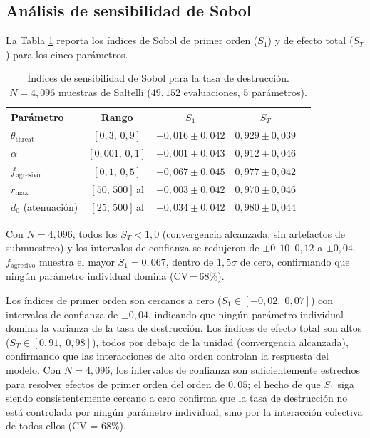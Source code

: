 \documentclass[11pt,a4paper,onecolumn]{article}
\begin{document}
\subsection{Análisis de sensibilidad de Sobol}
\label{sec:sobol_results}

La Tabla \ref{tab:sobol} reporta los índices de Sobol de primer orden
($S_1$) y de efecto total ($S_T$) para los cinco parámetros.

\begin{table}
  \centering
  \caption{Índices de sensibilidad de Sobol para la tasa de destrucción.
           $N = 4{,}096$ muestras de Saltelli ($49{,}152$ evaluaciones,
           5 parámetros).}
  \label{tab:sobol}
  \begin{tabular}{lcccc}
    \toprule
    Parámetro & Rango & $S_1$ & $S_T$ \\
    \midrule
    $\theta_\text{threat}$ & $[0{,}3,\,0{,}9]$     & $-0{,}016\pm0{,}042$ & $0{,}929\pm0{,}039$ \\
    $\alpha$               & $[0{,}001,\,0{,}1]$   & $-0{,}001\pm0{,}043$ & $0{,}912\pm0{,}046$ \\
    $f_\text{agresivo}$    & $[0{,}1,\,0{,}5]$     & $+0{,}067\pm0{,}045$ & $0{,}977\pm0{,}042$ \\
    $r_\text{max}$         & $[50,\,500]$\,al       & $+0{,}003\pm0{,}042$ & $0{,}970\pm0{,}046$ \\
    $d_0$ (atenuación)     & $[25,\,500]$\,al       & $+0{,}034\pm0{,}042$ & $0{,}980\pm0{,}044$ \\
    \bottomrule
  \end{tabular}
  \begin{flushleft}
    \footnotesize
    Con $N = 4{,}096$, todos los $S_T < 1{,}0$ (convergencia alcanzada,
    sin artefactos de submuestreo) y los intervalos de confianza se
    redujeron de $\pm0{,}10$--$0{,}12$ a $\pm0{,}04$.
    $f_\text{agresivo}$ muestra el mayor $S_1 = 0{,}067$, dentro de
    $1{,}5\sigma$ de cero, confirmando que ningún parámetro individual
    domina (CV\,=\,68\%).
  \end{flushleft}
\end{table}

Los índices de primer orden son cercanos a cero
($S_1 \in [-0{,}02,\;0{,}07]$) con intervalos de confianza de
$\pm0{,}04$, indicando que ningún parámetro individual domina la
varianza de la tasa de destrucción.
Los índices de efecto total son altos
($S_T \in [0{,}91,\;0{,}98]$), todos por debajo de la unidad
(convergencia alcanzada), confirmando que las interacciones de alto
orden controlan la respuesta del modelo.
Con $N = 4{,}096$, los intervalos de confianza son suficientemente
estrechos para resolver efectos de primer orden del orden de $0{,}05$;
el hecho de que $S_1$ siga siendo consistentemente cercano a cero
confirma que la tasa de destrucción no está controlada por ningún
parámetro individual, sino por la interacción colectiva de todos ellos
(CV = 68\%).
\end{document}
